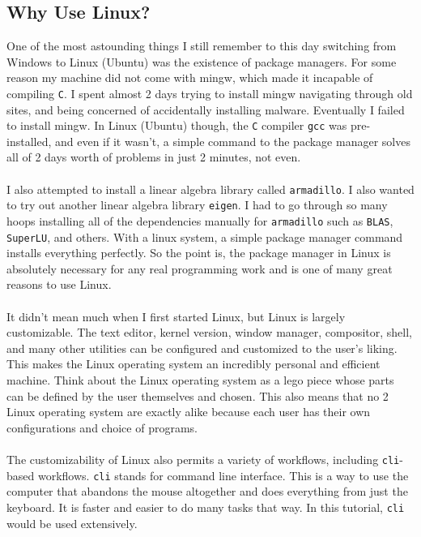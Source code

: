 \documentclass[a4paper, 12pt]{report}
\begin{document}
\begin{center}
\subsection{Why Use Linux?}
\begin{comment}
\end{comment}
One of the most astounding things I still remember to this day switching from Windows to Linux (Ubuntu) was the existence of package managers. For some reason my machine did not come with mingw, which made it incapable of compiling \texttt{C}. I spent almost 2 days trying to install mingw navigating through old sites, and being concerned of accidentally installing malware. Eventually I failed to install mingw. In Linux (Ubuntu) though, the \texttt{C} compiler \texttt{gcc} was pre-installed, and even if it wasn't, a simple command to the package manager solves all of 2 days worth of problems in just 2 minutes, not even.
\\~\\I also attempted to install a linear algebra library called \texttt{armadillo}. I also wanted to try out another linear algebra library \texttt{eigen}. I had to go through so many hoops installing all of the dependencies manually for \texttt{armadillo} such as \texttt{BLAS}, \texttt{SuperLU}, and others. With a linux system, a simple package manager command installs everything perfectly. So the point is, the package manager in Linux is absolutely necessary for any real programming work and is one of many great reasons to use Linux.
\\~\\It didn't mean much when I first started Linux, but Linux is largely customizable. The text editor, kernel version, window manager, compositor, shell, and many other utilities can be configured and customized to the user's liking. This makes the Linux operating system an incredibly personal and efficient machine. Think about the Linux operating system as a lego piece whose parts can be defined by the user themselves and chosen. This also means that no 2 Linux operating system are exactly alike because each user has their own configurations and choice of programs. 
\\~\\The customizability of Linux also permits a variety of workflows, including \texttt{cli}-based workflows. \texttt{cli} stands for command line interface. This is a way to use the computer that abandons the mouse altogether and does everything from just the keyboard. It is faster and easier to do many tasks that way. In this tutorial, \texttt{cli} would be used extensively.

\end{center}
\end{document}
